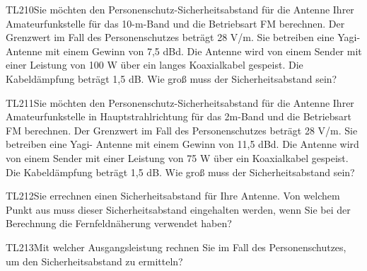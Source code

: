 \begin{question}{TL210}{Sie möchten den Personenschutz-Sicherheitsabstand für die Antenne Ihrer Amateurfunkstelle für das 10-m-Band und die Betriebsart FM berechnen. Der Grenzwert im Fall des Personenschutzes beträgt 28 V/m. Sie betreiben eine Yagi-Antenne mit einem Gewinn von 7,5 dBd. Die Antenne wird von einem Sender mit einer Leistung von 100 W über ein langes Koaxialkabel gespeist. Die Kabeldämpfung beträgt 1,5 dB. Wie groß muss der Sicherheitsabstand sein?}
\end{question}

\begin{question}{TL211}{Sie möchten den Personenschutz-Sicherheitsabstand für die Antenne Ihrer Amateurfunkstelle in Hauptstrahlrichtung für das 2m-Band und die Betriebsart FM berechnen. Der Grenzwert im Fall des Personenschutzes beträgt 28 V/m. Sie betreiben eine Yagi- Antenne mit einem Gewinn von 11,5 dBd. Die Antenne wird von einem Sender mit einer Leistung von 75 W über ein Koaxialkabel gespeist. Die Kabeldämpfung beträgt 1,5 dB. Wie groß muss der Sicherheitsabstand sein?}
\end{question}

\begin{question}{TL212}{Sie errechnen einen Sicherheitsabstand für Ihre Antenne. Von welchem Punkt aus muss dieser Sicherheitsabstand eingehalten werden, wenn Sie bei der Berechnung die Fernfeldnäherung verwendet haben?}
\end{question}

\begin{question}{TL213}{Mit welcher Ausgangsleistung rechnen Sie im Fall des Personenschutzes, um den Sicherheitsabstand zu ermitteln?}
\end{question}

